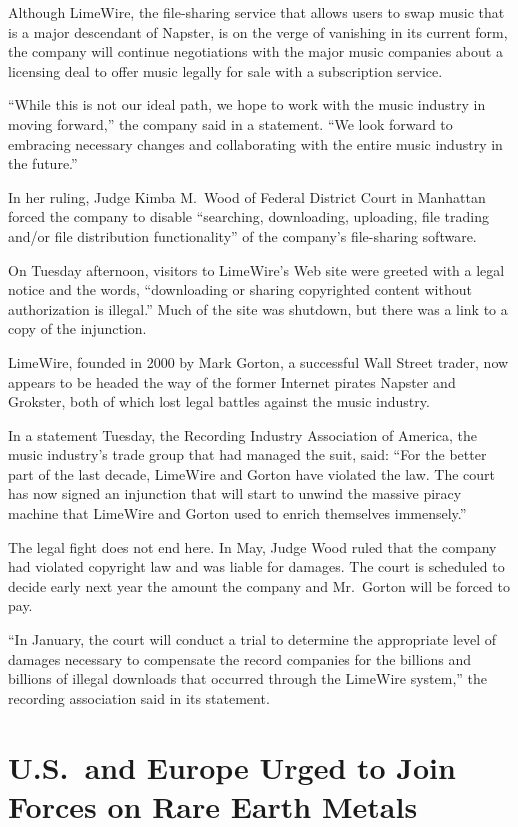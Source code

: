 ﻿\documentclass[12pt]{article}
\begin{document}
Although LimeWire, the file-sharing service that allows users to swap music that is a major
descendant of Napster, is on the verge of vanishing in its current form, the company will continue
negotiations with the major music companies about a licensing deal to offer music legally for sale
with a subscription service.

``While this is not our ideal path, we hope to work with the music industry in moving forward,'' the
company said in a statement. ``We look forward to embracing necessary changes and collaborating with
the entire music industry in the future.''

In her ruling, Judge Kimba M.~Wood of Federal District Court in Manhattan forced the company to
disable ``searching, downloading, uploading, file trading and/or file distribution functionality''
of the company's file-sharing software.

On Tuesday afternoon, visitors to LimeWire's Web site were greeted with a legal notice and the
words, ``downloading or sharing copyrighted content without authorization is illegal.'' Much of the
site was shutdown, but there was a link to a copy of the injunction.

LimeWire, founded in 2000 by Mark Gorton, a successful Wall Street trader, now appears to be headed
the way of the former Internet pirates Napster and Grokster, both of which lost legal battles
against the music industry.

In a statement Tuesday, the Recording Industry Association of America, the music industry's trade
group that had managed the suit, said: ``For the better part of the last decade, LimeWire and Gorton
have violated the law. The court has now signed an injunction that will start to unwind the massive
piracy machine that LimeWire and Gorton used to enrich themselves immensely.''

The legal fight does not end here. In May, Judge Wood ruled that the company had violated copyright
law and was liable for damages. The court is scheduled to decide early next year the amount the
company and Mr.~Gorton will be forced to pay.

``In January, the court will conduct a trial to determine the appropriate level of damages necessary
to compensate the record companies for the billions and billions of illegal downloads that occurred
through the LimeWire system,'' the recording association said in its statement.

\section{U.S.~and Europe Urged to Join Forces on Rare Earth Metals}
\end{document}
